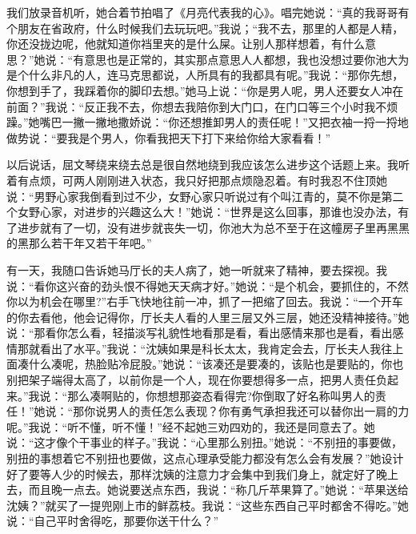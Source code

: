 \documentclass[12pt,oneside]{book}
\begin{document}
我们放录音机听，她合着节拍唱了《月亮代表我的心》。唱完她说：``真的我哥哥有个朋友在省政府，什么时候我们去玩玩吧。''我说；``我不去，那里的人都是人精，你还没拢边呢，他就知道你裆里夹的是什么屎。让别人那样想着，有什么意思？''她说：``有意思也是正常的，其实那点意思人人都想，我也没想过要你池大为是个什么非凡的人，连马克思都说，人所具有的我都具有呢。''我说：``那你先想，你想到手了，我踩着你的脚印去想。''她马上说：``你是男人呢，男人还要女人冲在前面？''我说：``反正我不去，你想去我陪你到大门口，在门口等三个小时我不烦躁。''她嘴巴一撇一撇地撒娇说：``你还想推卸男人的责任呢！''又把衣袖一捋一捋地做势说：``要我是个男人，你看我把天下打下来给你给大家看看！''

以后说话，屈文琴绕来绕去总是很自然地绕到我应该怎么进步这个话题上来。我听着有点烦，可两人刚刚进入状态，我只好把那点烦隐忍着。有时我忍不住顶她说：``男野心家我倒看到过不少，女野心家只听说过有个叫江青的，莫不你是第二个女野心家，对进步的兴趣这么大！''她说：``世界是这么回事，那谁也没办法，有了进步就有了一切，没有进步就丧失一切，你池大为总不至于在这幢房子里再黑黑的黑那么若干年又若干年吧。''

有一天，我随口告诉她马厅长的夫人病了，她一听就来了精神，要去探视。我说：``看你这兴奋的劲头恨不得她天天病才好。''她说：``是个机会，要抓住的，不然你以为机会在哪里?''右手飞快地往前一冲，抓了一把缩了回去。我说：``一个开车的你去看他，他会记得你，厅长夫人看的人里三层又外三层，她还没精神接待。''她说：``那看你怎么看，轻描淡写礼貌性地看那是看，看出感情来那也是看，看出感情那就看出了水平。''我说：``沈姨如果是科长太太，我肯定会去，厅长夫人我往上面凑什么凑呢，热脸贴冷屁股。''她说：``该凑还是要凑的，该贴也是要贴的，你也别把架子端得太高了，以前你是一个人，现在你要想得多一点，把男人责任负起来。''我说：``那么凑啊贴的，你想想那姿态看得完?你倒取了好名称叫男人的责任！''她说：``那你说男人的责任怎么表现？你有勇气承担我还可以替你出一肩的力呢。''我说：``听不懂，听不懂！''经不起她三劝四劝的，我还是同意去了。她说：``这才像个干事业的样子。''我说：``心里那么别扭。''她说：``不别扭的事要做，别扭的事想着它不别扭也要做，这点心理承受能力都没有怎么会有发展？''她设计好了要等人少的时候去，那样沈姨的注意力才会集中到我们身上，就定好了晚上去，而且晚一点去。她说要送点东西，我说：``称几斤苹果算了。''她说：``苹果送给沈姨？''就买了一提兜刚上市的鲜荔枝。我说：``这些东西自己平时都舍不得吃。''她说：``自己平时舍得吃，那要你送干什么？''
\end{document}
